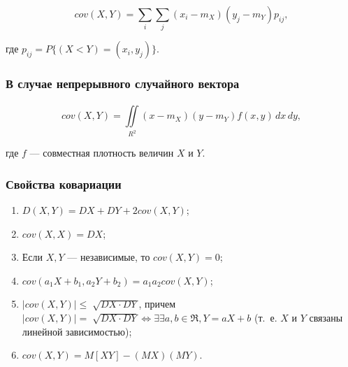 \begin{equation}
	cov(X, Y) =  \sum_{i}^{} \sum_{j}^{} (x_{i} - m_{X})(y_{j} - m_{Y})p_{ij},
\end{equation}

где $p_{ij} = P\{(X< Y) = (x_{i}, y_{j})\}$.

\subsubsection*{В случае непрерывного случайного вектора}

\begin{equation}
	cov(X, Y) = \iint\limits_{R^{2}}^{} (x - m_{X})(y - m_{Y})f(x, y)\,dx\,dy,
\end{equation}

где $f$ --- совместная плотность величин $X$ и $Y$.

\subsubsection*{Свойства ковариации}

\begin{enumerate}
	\item $D(X, Y) = DX + DY + 2cov(X, Y)$;
	\item $cov(X, X) = DX$;
	\item Если $X, Y$ --- независимые, то $cov(X, Y) = 0$;
	\item $cov(a_{1}X + b_{1}, a_{2}Y + b_{2}) = a_{1}a_{2}cov(X, Y)$;
	\item $|cov(X, Y)| \leqslant \sqrt[]{DX \cdot DY}$, причем $|cov(X, Y)| = \sqrt[]{DX \cdot DY} \iff \exists \exists a, b \in \Re, Y = aX + b$ (т.~е. $X$ и $Y$ связаны линейной зависимостью);
	\item $cov(X, Y) = M[XY] - (MX)(MY)$.
\end{enumerate}